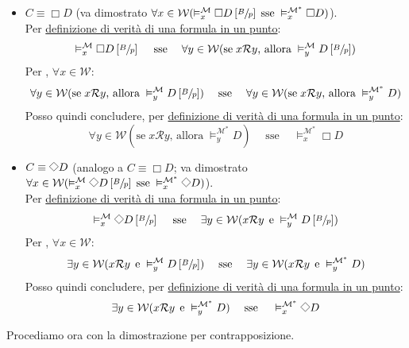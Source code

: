 \documentclass[a4paper,12pt]{article}
\newcommand{\latinmath}[1]{\text{\latinmodern{#1}}} %
\newcommand{\Dmd}{\mathord{\vcenter{\hbox{\tikz[baseline=-0.6ex]{\draw[line width=0.4pt, scale=1, rotate=45] (0,0) rectangle (0.2,0.2);}}}}} %
\begin{document}
\begin{description}
\begin{dimo}
\begin{dimo}
\begin{description}
\begin{itemize}
					\item $C \equiv \Box D$ (va dimostrato \emph{$\forall x \in \mathcal{W} (\vDash_x^{\mathcal{M}} \Box D \left[\sfrac{B}{p}\right] \; \text{sse} \; \vDash_x^{\mathcal{M^{\ast}}} \Box D)$}). \\
					Per \hyperlink{defverp}{definizione di verità di una formula in un punto}:
					$$\vDash_x^{\mathcal{M}} \Box D \left[\sfrac{B}{p}\right] \quad\; \text{sse} \quad\; \forall y \in \mathcal{W} (\text{se} \; x\mathcal{R}y \text{, allora} \; \vDash_y^{\mathcal{M}} D \left[\sfrac{B}{p}\right])$$
					Per \latinmath{IH1}, $\forall x \in \mathcal{W}$:
					$$\forall y \in \mathcal{W} (\text{se} \; x\mathcal{R}y \text{, allora} \; \vDash_y^{\mathcal{M}} D \left[\sfrac{B}{p}\right]) \quad\; \text{sse} \quad\; \forall y \in \mathcal{W} (\text{se} \; x\mathcal{R}y \text{, allora} \; \vDash_y^{\mathcal{M^{\ast}}} D)$$
					Posso quindi concludere, per \hyperlink{defverp}{definizione di verità di una formula in un punto}:
					$$\forall y \in \mathcal{W} (\text{se} \; x\mathcal{R}y \text{, allora} \; \vDash_y^{\mathcal{M^{\ast}}} D) \quad\; \text{sse} \quad\; \vDash_x^{\mathcal{M^{\ast}}} \Box D$$
					\item $C \equiv \Dmd D$ (analogo a $C \equiv \Box D$; va dimostrato \emph{$\forall x \in \mathcal{W} (\vDash_x^{\mathcal{M}} \Dmd D \left[\sfrac{B}{p}\right] \; \text{sse} \; \vDash_x^{\mathcal{M^{\ast}}} \Dmd D)$}). \\
					Per \hyperlink{defverp}{definizione di verità di una formula in un punto}:
					$$\vDash_x^{\mathcal{M}} \Dmd D \left[\sfrac{B}{p}\right] \quad\; \text{sse} \quad\; \exists y \in \mathcal{W} (x\mathcal{R}y \;\, \text{e} \; \vDash_y^{\mathcal{M}} D \left[\sfrac{B}{p}\right])$$
					Per \latinmath{IH1}, $\forall x \in \mathcal{W}$:
					$$\exists y \in \mathcal{W} (x\mathcal{R}y \;\, \text{e} \; \vDash_y^{\mathcal{M}} D \left[\sfrac{B}{p}\right]) \quad\; \text{sse} \quad\; \exists y \in \mathcal{W} (x\mathcal{R}y \;\, \text{e} \; \vDash_y^{\mathcal{M^{\ast}}} D)$$
					Posso quindi concludere, per \hyperlink{defverp}{definizione di verità di una formula in un punto}:
					$$\exists y \in \mathcal{W} (x\mathcal{R}y \;\, \text{e} \; \vDash_y^{\mathcal{M^{\ast}}} D) \quad\; \text{sse} \quad\; \vDash_x^{\mathcal{M^{\ast}}} \Dmd D$$
				\end{itemize}
			\end{description}
			\vspace*{-16pt} \raggedleft \qedhere
		\end{dimo}
		Procediamo ora con la dimostrazione per contrapposizione. \\

\end{dimo}
\end{description}
\end{document}
